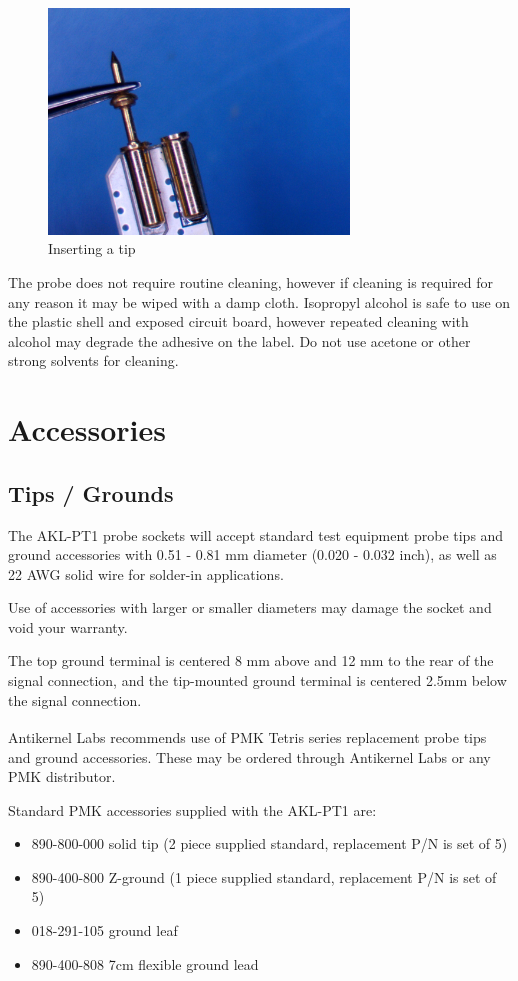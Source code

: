 \documentclass[11pt]{article}
\begin{document}
\begin{figure}[h!]
\centering
\includegraphics[width=8cm]{tip-insertion.jpg}
\caption{Inserting a tip}
\end{figure}

The probe does not require routine cleaning, however if cleaning is required for any reason it may be wiped with a damp
cloth. Isopropyl alcohol is safe to use on the plastic shell and exposed circuit board, however repeated cleaning with
alcohol may degrade the adhesive on the label. Do not use acetone or other strong solvents for cleaning.

\pagebreak
\section{Accessories}

\subsection{Tips / Grounds}

The AKL-PT1 probe sockets will accept standard test equipment probe tips and ground accessories with 0.51 - 0.81 mm
diameter (0.020 - 0.032 inch), as well as 22 AWG solid wire for solder-in applications.

Use of accessories with larger or smaller diameters may damage the socket and void your warranty.

The top ground terminal is centered 8 mm above and 12 mm to the rear of the signal connection, and the tip-mounted
ground terminal is centered 2.5mm below the signal connection.

Antikernel Labs recommends use of PMK Tetris\textsuperscript{\textregistered} series replacement probe tips and ground
accessories. These may be ordered through Antikernel Labs or any PMK distributor.

Standard PMK accessories supplied with the AKL-PT1 are:
\begin{itemize}
\item 890-800-000 solid tip (2 piece supplied standard, replacement P/N is set of 5)
\item 890-400-800 Z-ground (1 piece supplied standard, replacement P/N is set of 5)
\item 018-291-105 ground leaf
\item 890-400-808 7cm flexible ground lead
\end{itemize}
\end{document}
